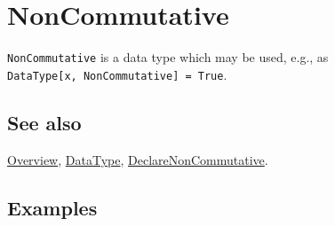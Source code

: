 \documentclass[../FeynCalcManual.tex]{subfiles}
\begin{document}
\hypertarget{noncommutative}{
\section{NonCommutative}\label{noncommutative}}

\texttt{NonCommutative} is a data type which may be used, e.g., as
\texttt{DataType[\allowbreak{}x,\ \allowbreak{}NonCommutative] = True}.

\subsection{See also}

\hyperlink{toc}{Overview}, \hyperlink{datatype}{DataType},
\hyperlink{declarenoncommutative}{DeclareNonCommutative}.

\subsection{Examples}
\end{document}
